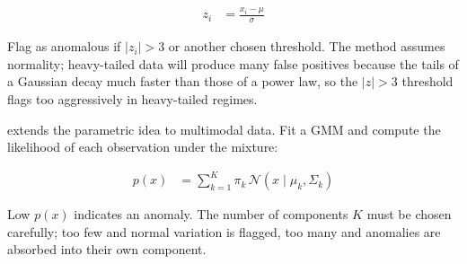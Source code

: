\begin{align*}
    z_i &= \frac{x_i - \mu}{\sigma}
\end{align*}

Flag as anomalous if $|z_i| > 3$ or another chosen threshold.
The method assumes normality; heavy-tailed data will produce many false positives because the tails of a Gaussian decay much faster than those of a power law, so the $|z| > 3$ threshold flags too aggressively in heavy-tailed regimes.

 extends the parametric idea to multimodal data.
Fit a GMM and compute the likelihood of each observation under the mixture:

\begin{align*}
    p(x) &= \sum_{k=1}^{K} \pi_k \, \mathcal{N}(x \mid \mu_k, \Sigma_k)
\end{align*}

Low $p(x)$ indicates an anomaly.
The number of components $K$ must be chosen carefully; too few and normal variation is flagged, too many and anomalies are absorbed into their own component.

\begin{marginfigure}
\centering
{}
\caption{A two-component GMM density. Points with $p(x)$ below the dashed threshold are flagged as anomalies. The grey point at $x{=}6.5$ sits in the tail and earns a low likelihood.}
\label{fig:gmm_density}
\end{marginfigure}

